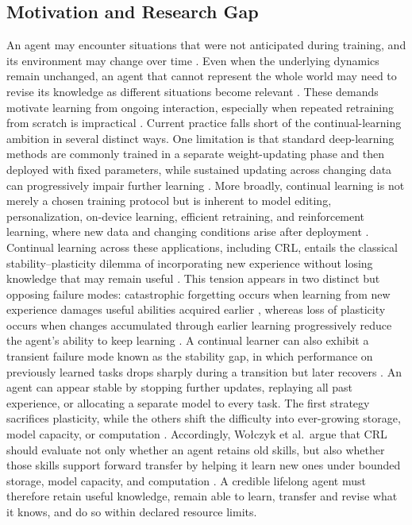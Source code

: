 \documentclass[10pt,journal,compsoc]{IEEEtran}
\begin{document}
\subsection{Motivation and Research Gap}

An agent may encounter situations that were not anticipated during training, and its environment may change over time \cite{khetarpal2022}.
Even when the underlying dynamics remain unchanged, an agent that cannot represent the whole world may need to revise its knowledge as different situations become relevant \cite{elelimy2025}.
These demands motivate learning from ongoing interaction, especially when repeated retraining from scratch is impractical \cite{verwimp2024}.
Current practice falls short of the continual-learning ambition in several distinct ways.
One limitation is that standard deep-learning methods are commonly trained in a separate weight-updating phase and then deployed with fixed parameters, while sustained updating across changing data can progressively impair further learning \cite{dohare2024}.
More broadly, continual learning is not merely a chosen training protocol but is inherent to model editing, personalization, on-device learning, efficient retraining, and reinforcement learning, where new data and changing conditions arise after deployment \cite{verwimp2024}.
Continual learning across these applications, including CRL, entails the classical stability--plasticity dilemma of incorporating new experience without losing knowledge that may remain useful \cite{carpenter1987,anand2023}.
This tension appears in two distinct but opposing failure modes: catastrophic forgetting occurs when learning from new experience damages useful abilities acquired earlier \cite{mccloskey1989,french1999,kirkpatrick2017}, whereas loss of plasticity occurs when changes accumulated through earlier learning progressively reduce the agent's ability to keep learning \cite{dohare2024}.
A continual learner can also exhibit a transient failure mode known as the stability gap, in which performance on previously learned tasks drops sharply during a transition but later recovers \cite{delange2023}.
An agent can appear stable by stopping further updates, replaying all past experience, or allocating a separate model to every task.
The first strategy sacrifices plasticity, while the others shift the difficulty into ever-growing storage, model capacity, or computation \cite{wolczyk2021,harun2023}.
Accordingly, Wo{\l}czyk et al.\ argue that CRL should evaluate not only whether an agent retains old skills, but also whether those skills support forward transfer by helping it learn new ones under bounded storage, model capacity, and computation \cite{wolczyk2021}.
A credible lifelong agent must therefore retain useful knowledge, remain able to learn, transfer and revise what it knows, and do so within declared resource limits.
\end{document}
